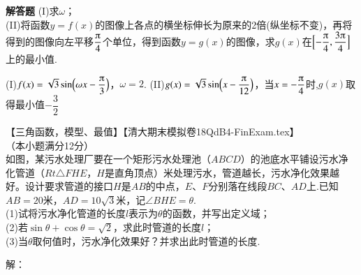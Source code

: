 \begin{exercise}{\bf 解答题}
          (I)求$\omega$；\\
          (II)将函数$y=f(x)$的图像上各点的横坐标伸长为原来的2倍(纵坐标不变)，再将得到的图像向左平移$\dfrac{\piup}4$个单位，得到函数$y=g(x)$的图像，求$g(x)$在$\Bigl[-\dfrac{\piup}4,\dfrac{3\piup}4\Bigr]$上的最小值.
          \begin{answer}
            (I)$f(x)=\sqrt3\sin\Bp{\omega x-\dfrac{\piup}3}$，$\omega=2$.
            (II)$g(x)=\sqrt3\sin\Bp{x-\dfrac{\piup}{12}}$，当$x=-\dfrac{\piup}4$时,$g(x)$取得最小值$-\dfrac32$
          \end{answer}
    \item 【三角函数，模型、最值】【清大期末模拟卷18QdB4-FinExam.tex】\\
      （本小题满分12分）\\
      如图，某污水处理厂要在一个矩形污水处理池（$ABCD$）的池底水平铺设污水净化管道（$Rt\triangle{FHE}$，$H$是直角顶点）米处理污水，管道越长，污水净化效果越好。设计要求管道的接口$H$是$AB$的中点，$E$、$F$分别落在线段$BC$、$AD$上.已知$AB=20$米，$AD=10\sqrt3$米，记$\angle{BHE}=\theta$.\\
      (1)试将污水净化管道的长度$l$表示为$\theta$的函数，并写出定义域；\\
      (2)若$\sin\theta+\cos\theta=\sqrt2$，求此时管道的长度$l$；\\
      (3)当$\theta$取何值时，污水净化效果好？并求出此时管道的长度.\\
      \begin{flushleft}
      \end{flushleft}
      \begin{answer}
        解：
      \end{answer}
  \end{exercise}
